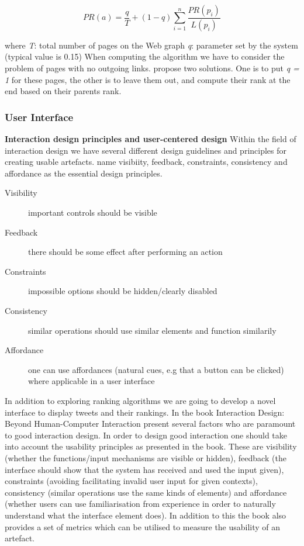 \[
PR(a) = \frac{q}{T} + (1 − q) \sum_{i=1}^{n} \frac{PR(p_i)}{L(p_i)}
\]

where\newline
\emph{T}: total number of pages on the Web graph\newline
\emph{q}: parameter set by the system (typical value is 0.15) \newline
When computing the algorithm we have to consider the problem of pages with no outgoing links. \citet{Baeza-Yates2011} propose two solutions. One is to put \emph{q = 1} for these pages, the other is to leave them out, and compute their rank at the end based on their parents rank. 


\subsubsection{User Interface}

{\bf Interaction design principles and user-centered design}\newline
Within the field of interaction design we have several different design guidelines and principles for creating usable artefacts. \citet{Sharp2007} name visibiity, feedback, constraints, consistency and affordance as the essential design principles.

\begin{description}
  \item[Visibility] important controls should be visible
  \item[Feedback] there should be some effect after performing an action
  \item[Constraints] impossible options should be hidden/clearly disabled
  \item[Consistency] similar operations should use similar elements and function similarily
  \item[Affordance] one can use affordances (natural cues, e.g that a button can be clicked) where applicable in a user interface
\end{description}

In addition to exploring ranking algorithms we are going to develop a novel interface to display tweets and their rankings. In the book Interaction Design: Beyond Human-Computer Interaction \citet{Sharp2007} present several factors who are paramount to good interaction design. In order to design good interaction one should take into account the usability principles as presented in the book. These are visibility (whether the functions/input mechanisms are visible or hidden), feedback (the interface should show that the system has received and used the input given), constraints (avoiding facilitating invalid user input for given contexts), consistency (similar operations use the same kinds of elements) and affordance (whether users can use familiarisation from experience in order to naturally understand what the interface element does). In addition to this the book also provides a set of metrics which can be utilised to measure the usability of an artefact.\newline

